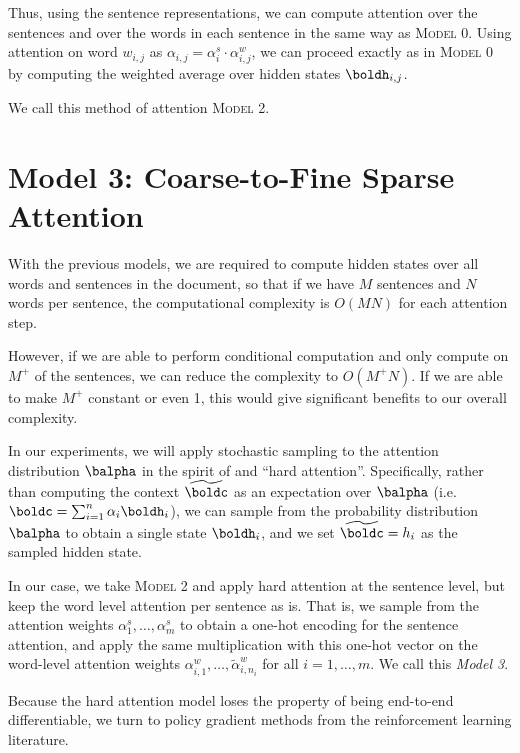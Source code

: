 \documentclass[11pt]{report}
\begin{document}

Thus, using the sentence representations, we can compute attention over the sentences and over the words in each sentence in the same way as \textsc{Model 0}. Using attention on word $w_{i,j}$ as  $\alpha_{i,j} = \alpha_i^s \cdot \alpha_{i,j}^w$, we can proceed exactly as in \textsc{Model 0} by computing the weighted average over hidden states $\boldh_{i,j}$.

We call this method of attention \textsc{Model 2}.

\section{Model 3: Coarse-to-Fine Sparse Attention}

With the previous models, we are required to compute hidden states over all words and sentences in the document, so that if we have $M$ sentences and $N$ words per sentence, the computational complexity is $O(MN)$ for each attention step.

However, if we are able to perform conditional computation and only compute on $M^+$ of the sentences, we can reduce the complexity to $O(M^+N)$. If we are able to make $M^+$ constant or even 1, this would give significant benefits to our overall complexity.

In our experiments, we will apply stochastic sampling to the attention distribution $\balpha$ in the spirit of \citet{xu2015captioning} and ``hard attention''.
Specifically, rather than computing the context $\widetilde{\boldc}$ as an expectation over $\balpha$ (i.e. $\boldc = \sum_{i=1}^n \alpha_i \boldh_i$), we can sample from the probability distribution $\balpha$ to obtain a single state $\boldh_i$, and we set $\widetilde{\boldc} = h_i$ as the sampled hidden state.

In our case, we take \textsc{Model 2} and apply hard attention at the sentence level, but keep the word level attention per sentence as is. That is, we sample from the attention weights $\alpha_1^s, \ldots, \alpha_m^s$ to obtain a one-hot encoding for the sentence attention, and apply the same multiplication with this one-hot vector on the word-level attention weights $\alpha_{i,1}^w, \ldots, \widetilde{\alpha}_{i,n_i}^w$ for all $i = 1, \ldots, m$. We call this \emph{Model 3}.


Because the hard attention model loses the property of being end-to-end differentiable, we turn to policy gradient methods from the reinforcement learning literature. %
\end{document}
